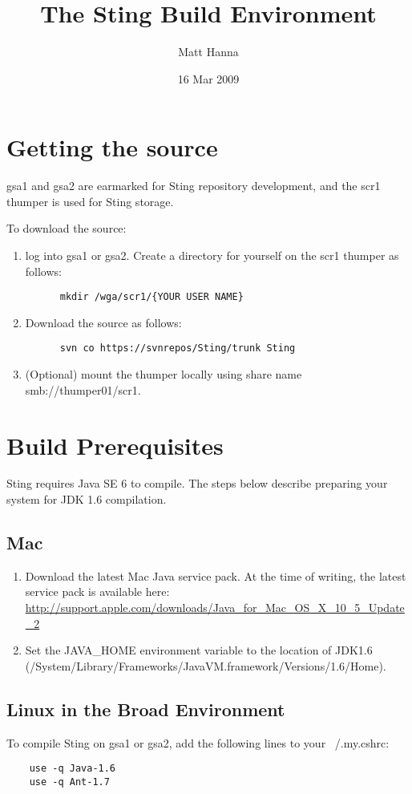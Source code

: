 \documentclass[11pt,fullpage]{article}
\begin{document}
\title{The Sting Build Environment}
\author{Matt Hanna}
\date{16 Mar 2009}
\maketitle

\section{Getting the source}
gsa1 and gsa2 are earmarked for Sting repository development, and the scr1 thumper is used for Sting storage.

To download the source:
\begin{enumerate}
  \item log into gsa1 or gsa2.  Create a directory for yourself on the scr1 thumper as follows:
    \begin{verbatim}
      mkdir /wga/scr1/{YOUR USER NAME}
    \end{verbatim}
  \item Download the source as follows:
    \begin{verbatim}
      svn co https://svnrepos/Sting/trunk Sting
    \end{verbatim}
  \item (Optional) mount the thumper locally using share name smb://thumper01/scr1.
\end{enumerate}

\section{Build Prerequisites}
Sting requires Java SE 6 to compile.  The steps below describe preparing your system for JDK 1.6 compilation.

\subsection{Mac}
\begin{enumerate}
  \item Download the latest Mac Java service pack.  At the time of writing, the latest service pack is available here: \url{http://support.apple.com/downloads/Java_for_Mac_OS_X_10_5_Update_2}
  \item Set the JAVA\_HOME environment variable to the location of JDK1.6 (/System/Library/Frameworks/JavaVM.framework/Versions/1.6/Home).
\end{enumerate}

\subsection{Linux in the Broad Environment}
  To compile Sting on gsa1 or gsa2, add the following lines to your ~/.my.cshrc:
  \begin{verbatim}
    use -q Java-1.6
    use -q Ant-1.7
  \end{verbatim}
\end{document}
